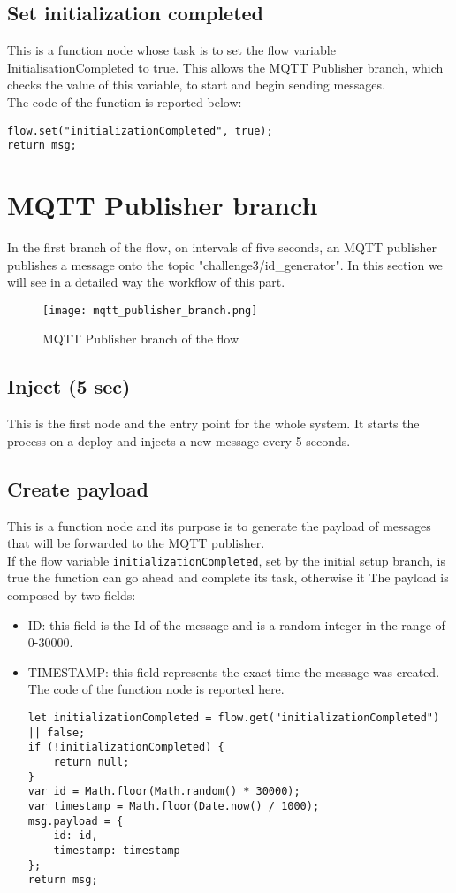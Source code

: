 \subsection{Set initialization completed}
This is a function node whose task is to set the flow variable InitialisationCompleted to true.
This allows the MQTT Publisher branch, which checks the value of this variable, to start and begin sending messages.\\
The code of the function is reported below:
\begin{verbatim}
flow.set("initializationCompleted", true);
return msg;
\end{verbatim}


\section{MQTT Publisher branch}
\label{sec:publisher_branch}
In the first branch of the flow, on intervals of five seconds, an MQTT publisher publishes a message onto the topic "challenge3/id\_generator". In this section we will see in a detailed way the workflow of this part.
\begin{figure}[H]
    \centering
    \texttt{[image: mqtt\_publisher\_branch.png]}
    \caption{MQTT Publisher branch of the flow}
\end{figure}

\subsection{Inject (5 sec)}
This is the first node and the entry point for the whole system. It starts the process on a deploy and injects a new message every 5 seconds.

\subsection{Create payload}
This is a function node and its purpose is to generate the payload of messages that will be forwarded to the MQTT publisher. \\
If the flow variable \verb|initializationCompleted|, set by the initial setup branch, is true the function can go ahead and complete its task, otherwise it 
The payload is composed by two fields:
\begin{itemize}
\item ID: this field is the Id of the message and is a random integer in the range of 0-30000.
\item TIMESTAMP: this field represents the exact time the message was created.
The code of the function node is reported here.
\begin{verbatim}
let initializationCompleted = flow.get("initializationCompleted") || false;
if (!initializationCompleted) {
    return null;    
}
var id = Math.floor(Math.random() * 30000);
var timestamp = Math.floor(Date.now() / 1000);
msg.payload = {
    id: id,
    timestamp: timestamp
};
return msg;
\end{verbatim}
\end{itemize}

